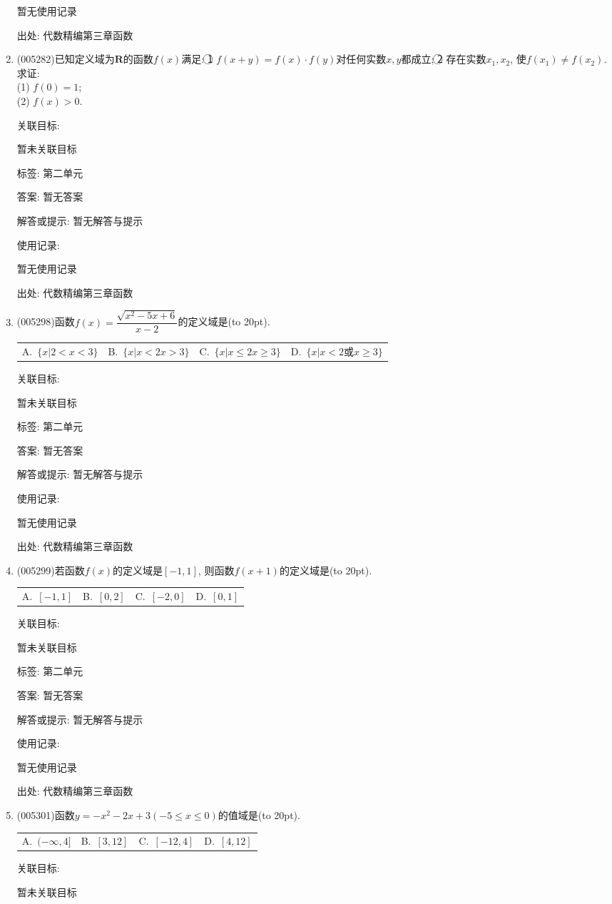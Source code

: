 \documentclass[10pt,a4paper]{article}
\newcommand{\bracket}[1]{(\hbox to #1pt{})}
\newcommand{\fourch}[4]{\par\begin{tabular}{p{.23\textwidth}p{.23\textwidth}p{.23\textwidth}p{.23\textwidth}}
A.~#1 &B.~#2& C.~#3& D.~#4
\end{tabular}}
\begin{document}
\begin{enumerate}[1.]
暂无使用记录


出处: 代数精编第三章函数
\item { (005282)}已知定义域为$\mathbf{R}$的函数$f(x)$满足:
\textcircled{1} $f(x+y)=f(x)\cdot f(y)$对任何实数$x,y$都成立;
\textcircled{2} 存在实数$x_1,x_2$, 使$f(x_1)\ne f(x_2)$.
求证:\\
(1) $f(0)=1$;\\
(2) $f(x)>0$.


关联目标:

暂未关联目标



标签: 第二单元

答案: 暂无答案

解答或提示: 暂无解答与提示

使用记录:

暂无使用记录


出处: 代数精编第三章函数
\item { (005298)}函数$f(x)=\dfrac{\sqrt{x^2-5x+6}}{x-2}$的定义域是\bracket{20}.
\fourch{$\{x|2<x<3\}$}{$\{x|x<2x>3\}$}{$\{x|x\le 2x\ge 3\}$}{$\{x|x<2\text{或}x\ge 3\}$}


关联目标:

暂未关联目标



标签: 第二单元

答案: 暂无答案

解答或提示: 暂无解答与提示

使用记录:

暂无使用记录


出处: 代数精编第三章函数
\item { (005299)}若函数$f(x)$的定义域是$[-1,1]$, 则函数$f(x+1)$的定义域是\bracket{20}.
\fourch{$[-1,1]$}{$[0,2]$}{$[-2,0]$}{$[0,1]$}


关联目标:

暂未关联目标



标签: 第二单元

答案: 暂无答案

解答或提示: 暂无解答与提示

使用记录:

暂无使用记录


出处: 代数精编第三章函数
\item { (005301)}函数$y=-x^2-2x+3(-5\le x\le 0)$的值域是\bracket{20}.
\fourch{$(-\infty ,4]$}{$[3,12]$}{$[-12,4]$}{$[4,12]$}


关联目标:

暂未关联目标




\end{enumerate}
\end{document}

